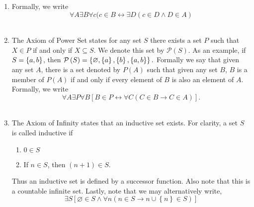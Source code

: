 \documentclass[12pt]{article}
\begin{document}
\begin{enumerate}
\item  Formally, we write \begin{equation}
 \forall A \exists B \forall c (c \in B \leftrightarrow \exists D (c \in D \wedge D \in A)
\end{equation} \\

\item The Axiom of Power Set states for any set $S$ there exists a set $P$ such that $X \in P$ if and only if $X \subseteq S$. We denote this set by $\mathcal P \left({S}\right)$. As an example, if $S=\left\{a,b\right\}$, then $\mathcal P \left({S}\right)=\left\{ \varnothing, \left\{a\right\}, \left\{b\right\}, \left\{a,b\right\}\right\}.$ Formally we say that given any set $A$, there is a set denoted by $P(A)$ such that given any set $B$, $B$ is a member of $P(A)$ if and only if every element of $B$ is also an element of $A$. Formally, we write \begin{equation}
\forall A \exists P \forall B [B \in P \leftrightarrow \forall C (C \in B \rightarrow C \in A)].
\end{equation} \\

\item The Axiom of Infinity states that an inductive set exists. For clarity, a set $S$ is called inductive if \\
\begin{enumerate}
\item $0 \in S$ \\
\item If $n \in S$, then $(n+1) \in S$.
\end{enumerate} 
Thus an inductive set is defined by a successor function. Also note that this is a countable infinite set. Lastly, note that we may alternatively write, 
\begin{equation}{}
\exists S [\varnothing \in S \wedge \forall n (n \in S \rightarrow n \cup \left\lbrace n \right\rbrace \in S)]
\end{equation}



\end{enumerate}
\end{document}
